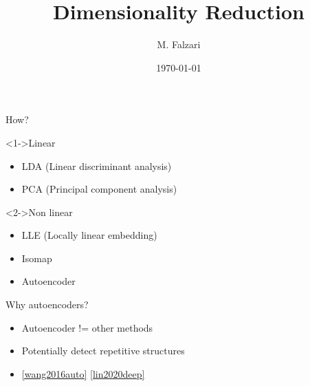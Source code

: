 \documentclass[presentation]{beamer}
\author{M. Falzari}
\date{\today}
\title{Dimensionality Reduction}
\begin{document}
\maketitle
\begin{frame}[label={sec:org066413b}]{How?}
\begin{block}<1->{Linear}
\begin{itemize}
\item LDA (Linear discriminant analysis)
\item PCA (Principal component analysis)
\end{itemize}
\end{block}
\begin{block}<2->{Non linear}
\begin{itemize}
\item LLE (Locally linear embedding)
\item Isomap
\item Autoencoder
\end{itemize}
\end{block}
\end{frame}
\begin{frame}[label={sec:org588e26e}]{Why autoencoders?}
\begin{block}{}
\begin{itemize}
\item Autoencoder != other methods
\item Potentially detect repetitive structures
\item \ref{wang2016auto} \ref{lin2020deep}
\end{itemize}
\end{block}
\end{frame}
\end{document}
